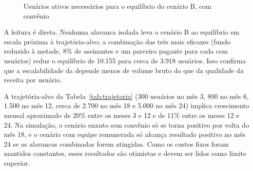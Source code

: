 

\begin{figure}[htb]
\centering
\caption{Usuários ativos necessários para o equilíbrio do cenário B, com convênio}
\label{fig:equilibrio}
\fonteautores
\end{figure}

A leitura é direta. Nenhuma alavanca isolada leva o cenário B ao equilíbrio em escala próxima à trajetória-alvo; a combinação das três mais eficazes (fundo reduzido à metade, 8\% de assinantes e um parceiro pagante para cada cem usuários) reduz o equilíbrio de 10.155 para cerca de 3.918 usuários. Isso confirma que a escalabilidade da \projeto{} depende menos de volume bruto do que da qualidade da receita por usuário.



A trajetória-alvo da Tabela~\ref{tab:trajetoria} (300 usuários no mês 3, 800 no mês 6, 1.500 no mês 12, cerca de 2.700 no mês 18 e 5.000 no mês 24) implica crescimento mensal aproximado de 20\% entre os meses 3 e 12 e de 11\% entre os meses 12 e 24. Na simulação, o cenário enxuto sem convênio só se torna positivo por volta do mês 18, e o cenário com equipe remunerada só alcança resultado positivo no mês 24 se as alavancas combinadas forem atingidas. Como os custos fixos foram mantidos constantes, esses resultados são otimistas e devem ser lidos como limite superior.
